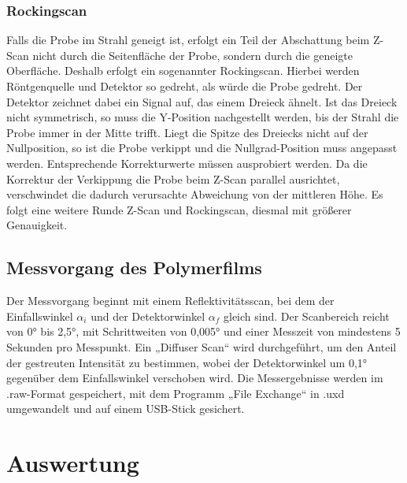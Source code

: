 \documentclass[12pt]{article}
\begin{document}
\subsubsection{Rockingscan}
Falls die Probe im Strahl geneigt ist, erfolgt ein Teil der Abschattung beim Z-Scan nicht durch die Seitenfläche der Probe, sondern durch die geneigte Oberfläche. Deshalb erfolgt ein sogenannter Rockingscan. Hierbei werden Röntgenquelle und Detektor so gedreht, als würde die Probe gedreht. Der Detektor zeichnet dabei ein Signal auf, das einem Dreieck ähnelt. Ist das Dreieck nicht symmetrisch, so muss die Y-Position nachgestellt werden, bis der Strahl die Probe immer in der Mitte trifft. Liegt die Spitze des Dreiecks nicht auf der Nullposition, so ist die Probe verkippt und die Nullgrad-Position muss angepasst werden. Entsprechende Korrekturwerte müssen ausprobiert werden.
Da die Korrektur der Verkippung die Probe beim Z-Scan parallel ausrichtet, verschwindet die dadurch verursachte Abweichung von der mittleren Höhe. Es folgt eine weitere Runde Z-Scan und Rockingscan, diesmal mit größerer Genauigkeit.
\subsection{Messvorgang des Polymerfilms}
Der Messvorgang beginnt mit einem Reflektivitätsscan, bei dem der Einfallswinkel $\alpha_i$ und der Detektorwinkel $\alpha_f$ gleich sind. Der Scanbereich reicht von 0° bis 2,5°, mit Schrittweiten von 0,005° und einer Messzeit von mindestens 5 Sekunden pro Messpunkt.
Ein „Diffuser Scan“ wird durchgeführt, um den Anteil der gestreuten Intensität zu bestimmen, wobei der Detektorwinkel um 0,1° gegenüber dem Einfallswinkel verschoben wird. Die Messergebnisse werden im .raw-Format gespeichert, mit dem Programm „File Exchange“ in .uxd umgewandelt und auf einem USB-Stick gesichert.

\section{Auswertung}\label{sec:auswertung}
\end{document}
